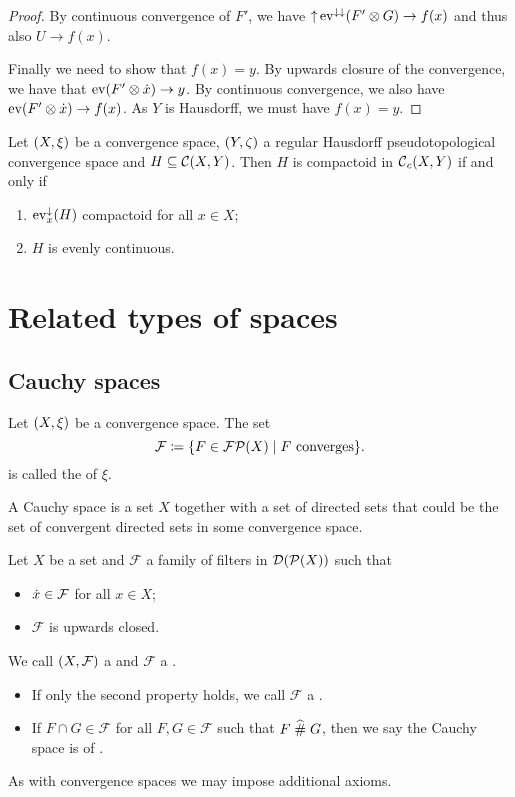 \begin{proof}
By continuous convergence of $F'$, we have $\operatorname{\uparrow}\operatorname{ev}^{\downarrow\downarrow}(F'\otimes G) \to f(x)$ and thus also $U\to f(x)$.

Finally we need to show that $f(x) = y$. By upwards closure of the convergence, we have that $\operatorname{ev}(F'\otimes \dot{x}) \to y$. By continuous convergence, we also have $\operatorname{ev}(F'\otimes \dot{x}) \to f(x)$. As $Y$ is Hausdorff, we must have $f(x) = y$.
\end{proof}

\begin{corollary}
Let $\left( X,\xi \right)$ be a convergence space, $\left( Y, \zeta \right)$ a regular Hausdorff pseudotopological convergence space and $H\subseteq \operatorname{\mathcal{C}}(X, Y)$. Then $H$ is compactoid in $\operatorname{\mathcal{C}}_c(X, Y)$ \textup{if and only if}
\begin{enumerate}
\item $\operatorname{ev}_x^\downarrow(H)$ compactoid for all $x\in X$;
\item $H$ is evenly continuous.
\end{enumerate}
\end{corollary}


\chapter{Related types of spaces}
\section{Cauchy spaces}
\begin{definition}
Let $\left( X,\xi \right)$ be a convergence space. The set
\[ \mathcal{F} \defeq \setbuilder{F\in\powerfilters(X)}{\text{$F$ converges}}. \]
is called the  of $\xi$.
\end{definition}
A Cauchy space is a set $X$ together with a set of directed sets that could be the set of convergent directed sets in some convergence space.
\begin{definition}
Let $X$ be a set and $\mathcal{F}$ a family of filters in $\operatorname{\mathcal{D}}(\operatorname{\mathcal{P}}(X))$ such that
\begin{itemize}
\item $\dot{x} \in \mathcal{F}$ for all $x\in X$;
\item $\mathcal{F}$ is upwards closed.
\end{itemize}
We call $\left( X, \mathcal{F} \right)$ a  and $\mathcal{F}$ a .

\begin{itemize}
\item If only the second property holds, we call $\mathcal{F}$ a .
\item If $F\cap G\in \mathcal{F}$ for all $F,G\in \mathcal{F}$ such that $F\mathrel{\widehat{\#}} G$, then we say the Cauchy space is of .
\end{itemize}
\end{definition}
As with convergence spaces we may impose additional axioms.


